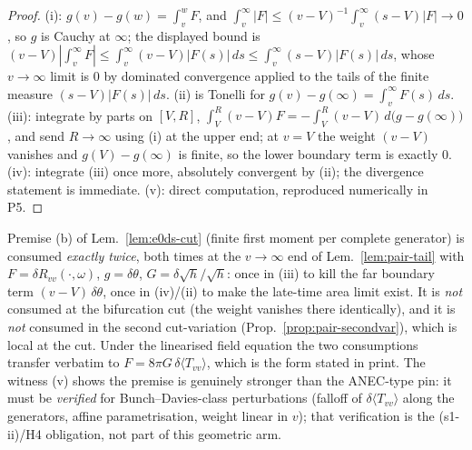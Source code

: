 \begin{proof}
(i): $g(v)-g(w)=\int_{v}^{w}F$, and $\int_{v}^{\infty}|F|\le
(v-V)^{-1}\int_{v}^{\infty}(s-V)|F|\to0$, so $g$ is Cauchy at
$\infty$; the displayed bound is $(v-V)|\int_{v}^{\infty}F|\le
\int_{v}^{\infty}(v-V)|F(s)|\,ds\le\int_{v}^{\infty}(s-V)|F(s)|\,ds$,
whose $v\to\infty$ limit is $0$ by dominated convergence applied to
the tails of the finite measure $(s-V)|F(s)|\,ds$. (ii) is Tonelli for
$g(v)-g(\infty)=\int_{v}^{\infty}F(s)\,ds$. (iii): integrate by parts
on $[V,R]$, $\int_{V}^{R}(v-V)F=-\int_{V}^{R}(v-V)\,d\bigl(g-
g(\infty)\bigr)$, and send $R\to\infty$ using (i) at the upper end;
at $v=V$ the weight $(v-V)$ vanishes and $g(V)-g(\infty)$ is finite,
so the lower boundary term is exactly $0$. (iv): integrate (iii) once
more, absolutely convergent by (ii); the divergence statement is
immediate. (v): direct computation, reproduced numerically in P5.
\end{proof}

\begin{remark}
\label{rem:pair-moment-locus}
Premise (b) of Lem.~\ref{lem:e0ds-cut} (finite first moment per
complete generator) is consumed \emph{exactly twice}, both times at
the $v\to\infty$ end of Lem.~\ref{lem:pair-tail} with
$F=\delta R_{vv}(\cdot,\omega)$, $g=\delta\theta$,
$G=\delta\sqrt h/\sqrt h$: once in (iii) to kill the far boundary term
$(v-V)\,\delta\theta$, once in (iv)/(ii) to make the late-time area
limit exist. It is \emph{not} consumed at the bifurcation cut (the
weight vanishes there identically), and it is \emph{not} consumed in
the second cut-variation (Prop.~\ref{prop:pair-secondvar}), which is
local at the cut. Under the linearised field equation the two
consumptions transfer verbatim to $F=8\pi G\,\delta\langle
T_{vv}\rangle$, which is the form stated in print. The witness (v)
shows the premise is genuinely stronger than the ANEC-type pin: it
must be \emph{verified} for Bunch--Davies-class perturbations
(falloff of $\delta\langle T_{vv}\rangle$ along the generators, affine
parametrisation, weight linear in $v$); that verification is the
(s1-ii)/H4 obligation, not part of this geometric arm.
\end{remark}

